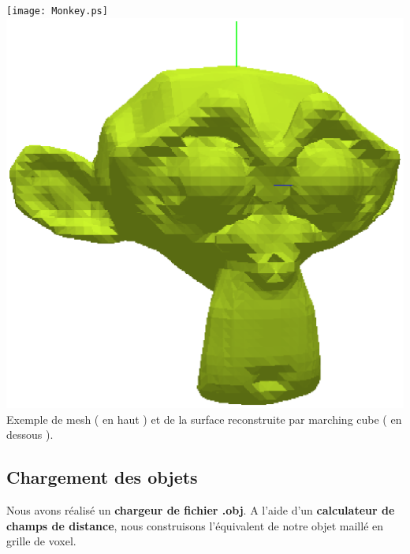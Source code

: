 \documentclass[a4paper,10pt]{article}
\begin{document}
\begin{center}
  \texttt{[image: Monkey.ps]}\\ 
  \includegraphics[scale=0.5]{FilledFace.ps}\\
  Exemple de mesh ( en haut ) et de la surface reconstruite par marching cube ( en dessous ).
\end{center}


\subsection{Chargement des objets}
Nous avons réalisé un \textbf{chargeur de fichier .obj}. A l'aide d'un \textbf{calculateur de
champs de distance}, nous construisons l'équivalent de notre objet maillé en grille de voxel.
\end{document}
